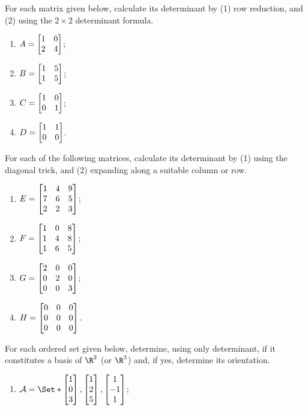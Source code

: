 \begin{exercises}
	\begin{problist}
		\prob For each matrix given below, calculate its determinant by (1) row
		reduction, and (2) using the $2\times 2$ determinant formula.
		\begin{enumerate}
			\item $A=\mat{1 & 0 \\ 2 & 4}$;

			\item $B=\mat{1 & 5 \\ 1 & 5}$;

			\item $C=\mat{1 & 0 \\ 0 & 1}$;

			\item $D=\mat{1 & 1 \\ 0 & 0}$.
		\end{enumerate}
		\prob For each of the following matrices, calculate its determinant by (1)
		using the diagonal trick, and (2) expanding along a suitable column or
		row.
		\begin{enumerate}
			\item $E=\mat{1 & 4 & 9 \\ 7 & 6 & 5 \\ 2 & 2 & 3}$;

			\item $F=\mat{1 & 0 & 8 \\ 1 & 4 & 8 \\ 1 & 6 & 5}$;

			\item $G=\mat{2 & 0 & 0 \\ 0 & 2 & 0 \\ 0 & 0 & 3}$;

			\item $H=\mat{0 & 0 & 0 \\ 0 & 0 & 0 \\ 0 & 0 & 0}$.
		\end{enumerate}
		\prob For each ordered set given below, determine, using only determinant,
		if it constitutes a basis of $\R^{2}$ (or $\R^{3}$) and, if yes,
		determine its orientation.
		\begin{enumerate}
			\item $\mathcal{A}=\Set*{\matc{1 \\ 0 \\ 3},\matc{1 \\ 2 \\ 5},\matc{1 \\ -1 \\ 1}}$;


\end{enumerate}
\end{problist}
\end{exercises}

